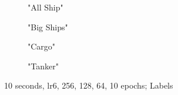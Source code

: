 \begin{figure}[H]
     \centering
     \begin{subfigure}[b]{0.496\textwidth}
         \centering
         
         \caption{"All Ship"}
     \end{subfigure}
     \hfill
     \begin{subfigure}[b]{0.496\textwidth}
         \centering
         
         \caption{"Big Ships"}
     \end{subfigure}
     \hfill
     \begin{subfigure}[b]{0.496\textwidth}
         \centering
         
         \caption{"Cargo"}
     \end{subfigure}
          \hfill
     \begin{subfigure}[b]{0.496\textwidth}
         \centering
         
         \caption{"Tanker"}
     \end{subfigure}
     \label{fig:resultsBar}
        \caption{10 seconds, lr6, 256, 128, 64, 10 epochs; Labels}
\end{figure}

